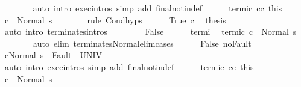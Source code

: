 \begin{isabellebody}
\ \ \ \ \ \ \isamarkupfalse%
\ {\isacharparenleft}auto\ intro{\isacharcolon}\ exec{\isachardot}intros\ simp\ add{\isacharcolon}\ final{\isacharunderscore}notin{\isacharunderscore}def{\isacharparenright}\isanewline
\ \ \ \ \isamarkupfalse%
\ termi{\isacharunderscore}c{}{\isacharprime}\ c{}{\isacharunderscore}c{}{\isacharprime}\ this\isanewline
\ \ \ \ \isamarkupfalse%
\ {\isachardoublequoteopen}{\isasymGamma}{\isasymturnstile}c{}\ {\isasymdown}\ Normal\ s{\isachardoublequoteclose}\isanewline
\ \ \ \ \ \ \isamarkupfalse%
\ {\isacharparenleft}rule\ Cond{\isachardot}hyps{\isacharparenright}\isanewline
\ \ \ \ \isamarkupfalse%
\ True\ c\ \isamarkupfalse%
\ {\isacharquery}thesis\isanewline
\ \ \ \ \ \ \isamarkupfalse%
\ {\isacharparenleft}auto\ intro{\isacharcolon}\ terminates{\isachardot}intros{\isacharparenright}\isanewline
\ \ \isamarkupfalse%
\isanewline
\ \ \ \ \isamarkupfalse%
\ False\isanewline
\ \ \ \ \isamarkupfalse%
\ termi\ \isamarkupfalse%
\ termi{\isacharunderscore}c{}{\isacharprime}{\isacharcolon}\ {\isachardoublequoteopen}{\isasymGamma}{\isasymturnstile}c{}{\isacharprime}\ {\isasymdown}\ Normal\ s{\isachardoublequoteclose}\isanewline
\ \ \ \ \ \ \isamarkupfalse%
\ {\isacharparenleft}auto\ elim{\isacharcolon}\ terminates{\isacharunderscore}Normal{\isacharunderscore}elim{\isacharunderscore}cases{\isacharparenright}\isanewline
\ \ \ \ \isamarkupfalse%
\ False\ noFault\ \isamarkupfalse%
\ {\isachardoublequoteopen}{\isasymGamma}{\isasymturnstile}{\isasymlangle}c{}{\isacharprime}{\isacharcomma}Normal\ s\ {\isasymrangle}\ {\isasymRightarrow}{\isasymnotin}Fault\ {\isacharbackquote}\ UNIV{\isachardoublequoteclose}\isanewline
\ \ \ \ \ \ \isamarkupfalse%
\ {\isacharparenleft}auto\ intro{\isacharcolon}\ exec{\isachardot}intros\ simp\ add{\isacharcolon}\ final{\isacharunderscore}notin{\isacharunderscore}def{\isacharparenright}\isanewline
\ \ \ \ \isamarkupfalse%
\ termi{\isacharunderscore}c{}{\isacharprime}\ c{}{\isacharunderscore}c{}{\isacharprime}\ this\isanewline
\ \ \ \ \isamarkupfalse%
\ {\isachardoublequoteopen}{\isasymGamma}{\isasymturnstile}c{}\ {\isasymdown}\ Normal\ s{\isachardoublequoteclose}\isanewline
\ \ \ \ \ \ \isamarkupfalse%

\end{isabellebody}

